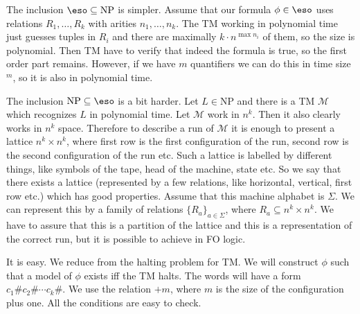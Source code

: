 {
The inclusion $\eso \subseteq \text{NP}$ is simpler.
Assume that our formula $\phi \in \eso$ uses relations $R_1, \ldots, R_k$
with arities $n_1, \ldots, n_k$.
The TM working in polynomial time just guesses tuples in $R_i$ and there are maximally $k \cdot n^{\max{n_i}}$ of them,
so the size is polynomial. Then TM have to verify that indeed the formula is true, so the first order part remains.
However, if we have $m$ quantifiers we can do this in time size$^m$, so it is also in polynomial time.

The inclusion $\text{NP} \subseteq \eso$ is a bit harder. Let $L \in \text{NP}$ and there is a TM $\mathcal{M}$
which recognizes $L$ in polynomial time. Let $\mathcal{M}$ work in $n^k$. Then it also clearly works in $n^k$ space.
Therefore to describe a run of $\mathcal{M}$ it is enough to present a lattice $n^k \times n^k$, where first row is the first
configuration of the run, second row is the second configuration of the run etc. Such a lattice is labelled by different things,
like symbols of the tape, head of the machine, state etc. So we say that there exists a lattice (represented by a few relations,
like horizontal, vertical, first row etc.) which has good properties.
Assume that this machine alphabet is $\Sigma$. We can represent
this by a family of relations $\{R_a\}_{a \in \Sigma}$, where $R_a \subseteq n^k \times n^k$. We have to assure that
this is a partition of the lattice and this is a representation of the correct run, but it is possible to achieve in FO logic.
}






{
It is easy. We reduce from the halting problem for TM. We will construct $\phi$ such that a model of $\phi$ exists
iff the TM halts. The words will have a form $c_1 \# c_2 \# \cdots c_k \#$. We use the relation $+m$, where
$m$ is the size of the configuration plus one. All the conditions are easy to check.
}



